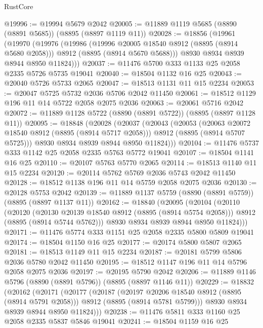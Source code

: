 \begin{lexlean}{RustCore}
\begin{coremodule}
@19996 := @19994 @5679 @2042
@20005 := @11889 @1119 @5685 (@8890 (@8891 @5685)) (@8895 (@8897 @1119 @11))
@20028 := @18856
    (@19961
      (@19970
        (@19976
          (@19986
            (@19996 @20005 @18540 @8912 (@8895 (@8914 @5680 @2058)))
            @8912
            (@8895 (@8914 @5670 @5688)))
          @8930
          @8934
          @8939
          @8944
          @8950
          @11824)))
@20037 := @11476 @5700 @333 @1133 @25 @2058 @2335 @5726 @5735 @19041
@20040 := @18504 @1132 @16 @25
@20043 := @20040 @5726 @5733 @2065
@20047 := @18513 @1131 @11 @15 @2234
@20053 := @20047 @5725 @5732 @2036 @5706 @2042 @11450
@20061 := @18512 @1129 @196 @11 @14 @5722 @2058 @2075 @2036
@20063 := @20061 @5716 @2042
@20072 := @11889 @1128 @5722 (@8890 (@8891 @5722)) (@8895 (@8897 @1128 @11))
@20095 := @18848
    (@20028
      (@20037
        (@20043
          (@20053
            (@20063 @20072 @18540 @8912 (@8895 (@8914 @5717 @2058)))
            @8912
            (@8895 (@8914 @5707 @5725)))
          @8930
          @8934
          @8939
          @8944
          @8950
          @11824)))
@20104 := @11476 @5737 @333 @1142 @25 @2058 @2335 @5763 @5772 @19041
@20107 := @18504 @1141 @16 @25
@20110 := @20107 @5763 @5770 @2065
@20114 := @18513 @1140 @11 @15 @2234
@20120 := @20114 @5762 @5769 @2036 @5743 @2042 @11450
@20128 := @18512 @1138 @196 @11 @14 @5759 @2058 @2075 @2036
@20130 := @20128 @5753 @2042
@20139 := @11889 @1137 @5759 (@8890 (@8891 @5759)) (@8895 (@8897 @1137 @11))
@20162 := @18840
    (@20095
      (@20104
        (@20110
          (@20120
            (@20130 @20139 @18540 @8912 (@8895 (@8914 @5754 @2058)))
            @8912
            (@8895 (@8914 @5744 @5762)))
          @8930
          @8934
          @8939
          @8944
          @8950
          @11824)))
@20171 := @11476 @5774 @333 @1151 @25 @2058 @2335 @5800 @5809 @19041
@20174 := @18504 @1150 @16 @25
@20177 := @20174 @5800 @5807 @2065
@20181 := @18513 @1149 @11 @15 @2234
@20187 := @20181 @5799 @5806 @2036 @5780 @2042 @11450
@20195 := @18512 @1147 @196 @11 @14 @5796 @2058 @2075 @2036
@20197 := @20195 @5790 @2042
@20206 := @11889 @1146 @5796 (@8890 (@8891 @5796)) (@8895 (@8897 @1146 @11))
@20229 := @18832
    (@20162
      (@20171
        (@20177
          (@20187
            (@20197 @20206 @18540 @8912 (@8895 (@8914 @5791 @2058)))
            @8912
            (@8895 (@8914 @5781 @5799)))
          @8930
          @8934
          @8939
          @8944
          @8950
          @11824)))
@20238 := @11476 @5811 @333 @1160 @25 @2058 @2335 @5837 @5846 @19041
@20241 := @18504 @1159 @16 @25

\end{coremodule}
\end{lexlean}
